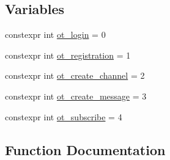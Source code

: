 \subsection*{Variables}
\begin{DoxyCompactItemize}
\item 
constexpr int \hyperlink{namespaceexample_1_1to__c_a1c413c74bbeeb1dac71eb03f6fff15f4}{ot\+\_\+login} = 0
\item 
constexpr int \hyperlink{namespaceexample_1_1to__c_a25c07b1a24b3a551b7345e568f301dcd}{ot\+\_\+registration} = 1
\item 
constexpr int \hyperlink{namespaceexample_1_1to__c_a18193092770b31fb4ca1288392ffc4b5}{ot\+\_\+create\+\_\+channel} = 2
\item 
constexpr int \hyperlink{namespaceexample_1_1to__c_a2b9a654e3547c13f770851600e4231d0}{ot\+\_\+create\+\_\+message} = 3
\item 
constexpr int \hyperlink{namespaceexample_1_1to__c_ae7d3f340353b066ddc0703fc2c2ca5c7}{ot\+\_\+subscribe} = 4
\end{DoxyCompactItemize}


\subsection{Function Documentation}
\hypertarget{namespaceexample_1_1to__c_ad5209fcbd7b509f14576e86ee3840db9}{}
